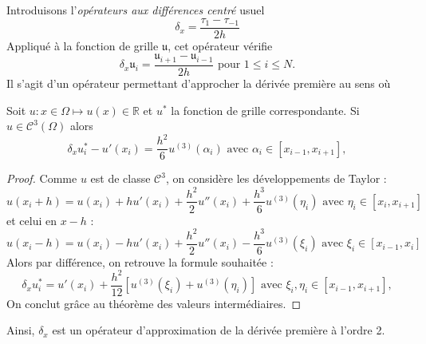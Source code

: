 Introduisons l'\textit{opérateurs aux différences centré} usuel
\begin{equation}
\delta_x = \dfrac{\tau_1 - \tau_{-1}}{2h}
\end{equation}
Appliqué à la fonction de grille $\mathfrak{u}$, cet opérateur vérifie 
\begin{equation}
\delta_x \mathfrak{u}_i = \dfrac{\mathfrak{u}_{i+1} - \mathfrak{u}_{i-1}}{2h} \text{ pour } 1 \leq i \leq N.
\end{equation}
Il s'agit d'un opérateur permettant d'approcher la dérivée première au sens où

\begin{proposition}
Soit $u: x \in \Omega \mapsto u(x) \in \mathbb{R}$ et $u^*$ la fonction de grille correspondante. Si $u \in \mathcal{C}^3 (\Omega)$ alors 
\begin{equation}
\delta_x u^*_i - u'(x_i) = \dfrac{h^2}{6} u^{(3)}(\alpha_i) \text{ avec } \alpha_i \in [x_{i-1}, x_{i+1}],
\end{equation}
\end{proposition}

\begin{proof}
Comme $u$ est de classe $\mathcal{C}^3$, on considère les développements de Taylor :
\begin{equation}
u(x_i+h) = u(x_i) + h u'(x_i) + \dfrac{h^2}{2} u''(x_i) + \dfrac{h^3}{6} u^{(3)} (\eta_i) \text{ avec } \eta_i \in [x_i, x_{i+1}]
\end{equation}
et celui en $x-h$ :
\begin{equation}
u(x_i-h) = u(x_i) - h u'(x_i) + \dfrac{h^2}{2} u''(x_i) - \dfrac{h^3}{6}u^{(3)}(\xi_i) \text{ avec } \xi_i \in [x_{i-1}, x_{i}]
\end{equation}
Alors par différence, on retrouve la formule souhaitée : 
\begin{equation}
\delta_x u^*_i = u'(x_i) + \dfrac{h^2}{12} \left[ u^{(3)}(\xi_i) + u^{(3)}(\eta_i) \right]  \text{ avec } \xi_i, \eta_i \in [x_{i-1}, x_{i+1}],
\end{equation}
On conclut grâce au théorème des valeurs intermédiaires.
\end{proof}

Ainsi, $\delta_x$ est un opérateur d'approximation de la dérivée première à l'ordre 2. 
















































